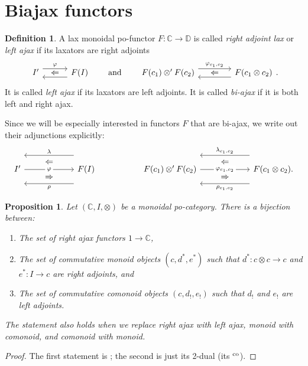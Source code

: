 \documentclass[11pt, oneside, article]{memoir}
\theoremstyle{plain}
\newtheorem{proposition}[theorem]{Proposition}
\theoremstyle{definition}
\newtheorem{definition}[theorem]{Definition}
\theoremstyle{remark}
\newcommand{\tn}[1]{\textnormal{#1}}
\newcommand{\co}{^{\tn{co}}}
\newcommand{\cc}{\mathbb{C}}
\newcommand{\dd}{\mathbb{D}}
\newcommand{\lsh}[1]{#1_!}
\newcommand{\ust}[1]{#1^\ast}
\newcommand{\qqand}{\qquad\text{and}\qquad}
\newcommand{\adjphantom}[3][-.6pt]{\ar[#2, phantom, "#3" yshift=#1]}
\newcommand{\adjr}[5][30pt]{%
\begin{tikzcd}[ampersand replacement=\&, column sep=#1]
  #2\ar[r, shift left=5pt, "{#3}"]\adjphantom{r}{\Leftarrow}\&
  #5\ar[l, shift left=5pt, "{#4}"]
\end{tikzcd}
}
\begin{document}
\section{Biajax functors}

\begin{definition}
A lax monoidal po-functor $F\colon\cc\to\dd$ is called \emph{right adjoint lax} or \emph{left ajax} if its laxators are right adjoints
\[
	\adjr{I'}{\varphi}{}{F(I)}
  \qqand
  \adjr[40pt]{F(c_1)\otimes' F(c_2)}{\varphi_{c_1,c_2}}{}{F(c_1\otimes c_2)}.
\]
It is called \emph{left ajax} if its laxators are left adjoints. It is called \emph{bi-ajax} if it is both left and right ajax.
\end{definition}
Since we will be especially interested in functors $F$ that are bi-ajax, we write out their adjunctions explicitly:
\begin{equation}\label{eqn.bi-ajax}
\begin{tikzcd}[column sep=60pt, ampersand replacement=\&]
	I'
		\ar[r, "\varphi" description]
		\ar[r, shift left=9pt, phantom, "\Leftarrow" yshift=-.6pt]
		\ar[r, shift right=9pt, phantom, "\Rightarrow" yshift=-.6pt]
	\&
	F(I)
		\ar[l, shift left=17pt, "\rho"]
		\ar[l, shift right=17pt, "\lambda"']
\end{tikzcd}
\hspace{.7in}
\begin{tikzcd}[column sep=60pt, ampersand replacement=\&]
	F(c_1)\otimes' F(c_2)
		\ar[r, "\varphi_{c_1,c_2}" description]
		\ar[r, shift left=9pt, phantom, "\Leftarrow" yshift=-.6pt]
		\ar[r, shift right=9pt, phantom, "\Rightarrow" yshift=-.6pt]
	\&
	F(c_1\otimes c_2).
		\ar[l, shift left=17pt, "\rho_{c_1,c_2}"]
		\ar[l, shift right=17pt, "\lambda_{c_1,c_2}"']
\end{tikzcd}
\end{equation}

\begin{proposition}\label{prop.adjoint_monoids}
Let $(\cc,I,\otimes)$ be a monoidal po-category. There is a bijection between:
\begin{enumerate}
	\item The set of right ajax functors $1\to\cc$,
	\item The set of commutative monoid objects $(c,\ust{d},\ust{e})$ such that $\ust{d}\colon c\otimes c\to c$ and $\ust{e}\colon I\to c$ are right adjoints, and
	\item The set of commutative comonoid objects $(c,\lsh{d},\lsh{e})$ such that $\lsh{d}$ and $\lsh{e}$ are left adjoints.
\end{enumerate}
The statement also holds when we replace right ajax with left ajax, monoid with comonoid, and comonoid with monoid.
\end{proposition}
\begin{proof}
The first statement is \cite[Proposition 3.4]{fong2018graphical}; the second is just its 2-dual (its $\co$).
\end{proof}
\end{document}

